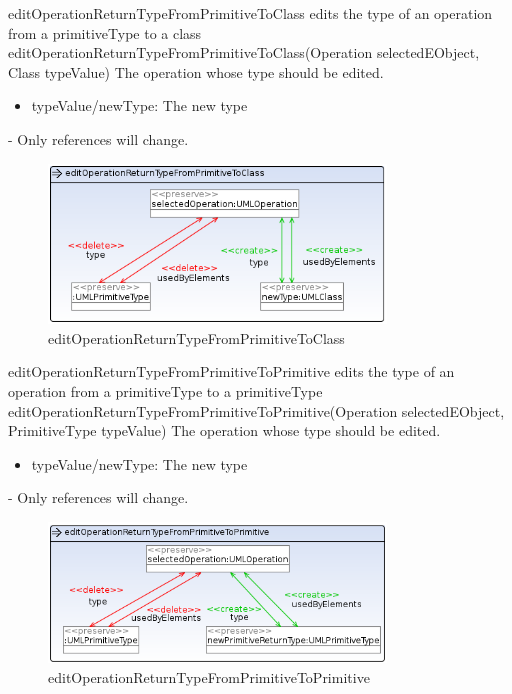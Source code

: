 \op
{editOperationReturnTypeFromPrimitiveToClass}
{edits the type of an operation from a primitiveType to a class}
{editOperationReturnTypeFromPrimitiveToClass(Operation selectedEObject, Class typeValue)}
{The operation whose type should be edited.}
{
\begin{itemize}
 \item typeValue/newType: The new type
\end{itemize}
}
{-}
{Only references will change.}
\begin{figure}[H]
  \centering
  \includegraphics[width=0.8\textwidth]{pics/editOperationReturnTypeFromPrimitiveToClass.png}
  \caption{editOperationReturnTypeFromPrimitiveToClass}
  \label{editOperationReturnTypeFromPrimitiveToClass}
\end{figure}
\op
{editOperationReturnTypeFromPrimitiveToPrimitive}
{edits the type of an operation from a primitiveType to a primitiveType}
{editOperationReturnTypeFromPrimitiveToPrimitive(Operation selectedEObject, PrimitiveType typeValue)}
{The operation whose type should be edited.} {
\begin{itemize}
 \item typeValue/newType: The new type
\end{itemize}
}
{-}
{Only references will change.}
\begin{figure}[H]
  \centering
  \includegraphics[width=0.8\textwidth]{pics/editOperationReturnTypeFromPrimitiveToPrimitive.png}
  \caption{editOperationReturnTypeFromPrimitiveToPrimitive}
  \label{editOperationReturnTypeFromPrimitiveToPrimitive}
\end{figure}
